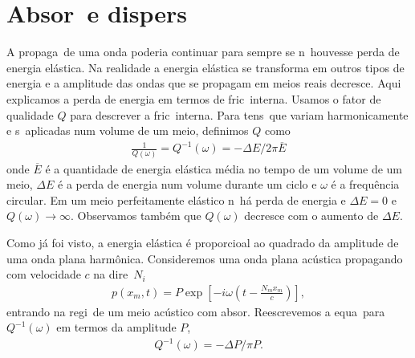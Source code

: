 
\section{Absor\cao\ e dispers\ao}

A propaga\cao\ de uma onda poderia continuar para sempre se n\ao\
houvesse perda de energia el\'astica. Na realidade a energia el\'astica
se transforma em outros tipos de energia e a amplitude das ondas que se
propagam em meios reais decresce. Aqui explicamos a perda de energia em
termos de fric\cao\ interna. Usamos o fator de qualidade $Q$ para
descrever a fric\cao\ interna. Para tens\oes\ que variam harmonicamente
e s\ao\ aplicadas num volume de um meio, definimos $Q$ como
\begin{eqnarray}
\frac{1}{Q(\omega)} = Q^{-1}(\omega) = -\Delta E/2\pi\overline{E}
\end{eqnarray}
onde $\overline{E}$ \'e a quantidade de energia el\'astica m\'edia no
tempo de um volume de um meio, $\Delta E$ \'e a perda de energia num
volume durante um ciclo e $\omega$ \'e a frequ\^encia circular. Em um
meio perfeitamente el\'astico n\ao\ h\'a perda de energia e $\Delta E =
0$ e $Q(\omega) \rightarrow \infty$. Observamos tamb\'em que $Q(\omega)$
decresce com o aumento de $\Delta E$.

Como j\'a foi visto, a energia el\'astica \'e proporcioal ao quadrado da
amplitude de uma onda plana harm\^onica. Consideremos uma onda plana
ac\'ustica propagando com velocidade $c$ na dire\cao\ $N_i$
\begin{eqnarray}
p(x_m,t) = P\exp\left[ -i\omega \left( t - \frac{N_m x_m}{c} \right) \right],
\end{eqnarray}
entrando na regi\ao\ de um meio ac\'ustico com absor\cao. Reescrevemos a
equa\cao\ para $Q^{-1}(\omega)$ em termos da amplitude $P$,
\begin{eqnarray}
Q^{-1}(\omega) = -\Delta P/\pi P.
\end{eqnarray}

